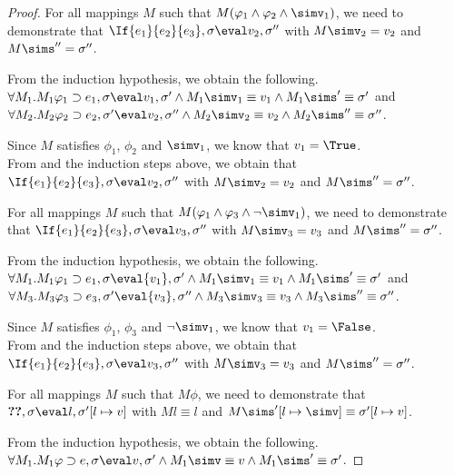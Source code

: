 \begin{proof}
   {For all mappings $M$
   such that $M(\phi_1\land \phi_2 \land \simv_1)$, we need to demonstrate that
   $\If{e_1}{e_2}{e_3},\sigma\eval v_2,\sigma''$ with
   $M \simv_2 = {v_2}$ and $M\sims''=\sigma''$.

   From the induction hypothesis, we obtain the following.\\
   $\forall M_1 . M_1\phi_1 \implies e_1,\sigma\eval v_1,\sigma'
   \land M_1\simv_1 \equiv {v_1} \land M_1\sims'\equiv{\sigma'}$
   and\\
   $\forall M_2 . M_2\phi_2 \implies e_2,\sigma'\eval v_2,\sigma''
   \land M_2 \simv_2 \equiv {v_2} \land M_2\sims'' \equiv{\sigma''}$.

   Since $M$ satisfies $\phi_1$, $\phi_2$ and $\simv_1$, we know that $v_1=\True$.\\
   From  and the induction steps above, we obtain that\\
   $\If{e_1}{e_2}{e_3},\sigma\eval v_2,\sigma''$ with $M\simv_2={v_2}$ and $M\sims''={\sigma''}$.

   For all mappings $M$ such that $M(\phi_1\land \phi_3 \land \neg \simv_1)$,
   we need to demonstrate that
   $\If{e_1}{e_2}{e_3},\sigma\eval v_3,\sigma''$ with
   $M \simv_3 = {v_3}$ and $M\sims''={\sigma''}$.

   From the induction hypothesis, we obtain the following.\\
   $\forall M_1 . M_1\phi_1 \implies e_1,\sigma\eval{v_1},{\sigma'}
   \land M_1\simv_1 \equiv {v_1} \land M_1\sims'\equiv{\sigma'}$
   and\\
   $\forall M_3 . M_3\phi_3 \implies e_3,\sigma'\eval{v_3},{\sigma''}
   \land M_3 \simv_3 \equiv {v_3} \land M_3\sims'' \equiv{\sigma''}$.

   Since $M$ satisfies $\phi_1$, $\phi_3$ and $\neg\simv_1$, we know that $v_1=\False$.\\
   From  and the induction steps above, we obtain that\\
    $\If{e_1}{e_2}{e_3},\sigma\eval v_3,\sigma''$
   with $M\simv_3={v_3}$ and $M\sims''={\sigma''}$.
  }

  {For all mappings $M$ such that $M\phi$,
  we need to demonstrate that\\
  $\Ref e,\sigma\eval l,\sigma'[l\mapsto v]$ with
  $M l \equiv l$ and $M\sims'[l\mapsto \simv]\equiv{\sigma'}[l\mapsto{v}]$.

  From the induction hypothesis, we obtain the following.\\
  $\forall M_1 .  M_1\phi \implies e, \sigma {\eval}{v},{\sigma'}\land  M_1\simv\equiv {v} \wedge  M_1\sims'\equiv{\sigma'}$.

}
\end{proof}
